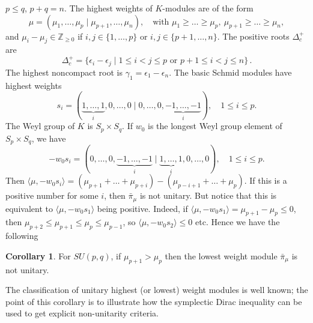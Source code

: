 \documentclass{amsart}[draft,11pt]
\newcommand{\bZ}{{\mathbb{Z}}}
\numberwithin{equation}{section}
\theoremstyle{definition}
\newtheorem{corollary}[theorem]{Corollary}
\begin{document}
 $p\le q$, $p+q=n$. The highest weights of $K$-modules are of the form
\[
\mu=(\mu_1,\dots,\mu_p\mid \mu_{p+1},\dots,\mu_n),\quad\text{with } \mu_1\ge\dots\ge\mu_p,\ \mu_{p+1}\ge\dots\ge\mu_n,
\]
and $\mu_i-\mu_j\in \bZ_{\ge 0}$ if $i,j\in\{1,\dots,p\}$ or $i,j\in\{p+1,\dots,n\}$. The positive roots $\Delta^+_c$ are 
\[
\Delta_c^+ = \{ \epsilon_i - \epsilon_j \mid 1 \le i < j \le p \text{ or }  p+1 \le i < j \le n\} \,.
\]
The highest noncompact root is $\gamma_1=\epsilon_1-\epsilon_n$. The basic Schmid modules have highest weights
\[
s_i=(\underbrace{1,\dots,1}_i,0,\dots,0\mid 0,\dots,0,\underbrace{-1,\dots,-1}_i), \quad 1\le i\le p.
\]
The Weyl group of $K$ is $S_p\times S_q$. If $w_0$ is the longest Weyl group element of $S_p\times S_q$, we have
\[
-w_0s_i=(0,\dots,0,\underbrace{-1,\dots,-1}_i\mid \underbrace{1,\dots,1}_i, 0,\dots,0), \quad 1\le i\le p.
\]
Then $\langle\mu,-w_0s_i\rangle=(\mu_{p+1}+\dots+\mu_{p+i})-(\mu_{p-i+1}+\dots+\mu_p).$ 
If this is a positive number for some $i$, then $\bar\pi_\mu$ is not unitary. But notice that this is equivalent to $\langle\mu,-w_0s_1\rangle$ being positive. Indeed, if  $\langle\mu,-w_0s_1\rangle=\mu_{p+1}-\mu_p\le 0$, then  $\mu_{p+2}\le\mu_{p+1}\le \mu_p\le\mu_{p-1}$, so $\langle\mu,-w_0s_2\rangle\le 0$ etc. Hence we have the following

\begin{corollary}
For $SU(p,q)$, if $\mu_{p+1}>\mu_p$ then the lowest weight module $\bar\pi_\mu$ is not unitary.
\end{corollary}


The classification of unitary highest (or lowest) weight modules is well known; the point of this corollary is to illustrate how the symplectic Dirac inequality can be used to get explicit non-unitarity criteria.
\end{document}
